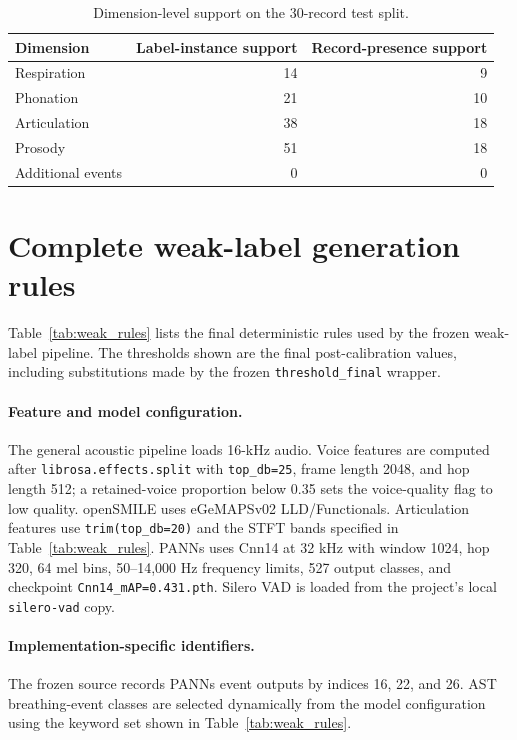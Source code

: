\documentclass[10pt]{article}
\begin{document}
\begin{table}[h]
\centering
\caption{Dimension-level support on the 30-record test split.}
\label{tab:test_dim_support}
\scriptsize
\begin{tabular}{lrr}
\toprule
Dimension & Label-instance support & Record-presence support \\
\midrule
Respiration & 14 & 9 \\
Phonation & 21 & 10 \\
Articulation & 38 & 18 \\
Prosody & 51 & 18 \\
Additional events & 0 & 0 \\
\bottomrule
\end{tabular}
\end{table}

\section{Complete weak-label generation rules}
Table~\ref{tab:weak_rules} lists the final deterministic rules used by the frozen weak-label pipeline. The thresholds shown are the final post-calibration values, including substitutions made by the frozen \texttt{threshold\_final} wrapper.

\paragraph{Feature and model configuration.}
The general acoustic pipeline loads 16-kHz audio. Voice features are computed after \texttt{librosa.effects.split} with \texttt{top\_db=25}, frame length 2048, and hop length 512; a retained-voice proportion below 0.35 sets the voice-quality flag to low quality. openSMILE uses eGeMAPSv02 LLD/Functionals. Articulation features use \texttt{trim(top\_db=20)} and the STFT bands specified in Table~\ref{tab:weak_rules}. PANNs uses Cnn14 at 32 kHz with window 1024, hop 320, 64 mel bins, 50--14,000 Hz frequency limits, 527 output classes, and checkpoint \texttt{Cnn14\_mAP=0.431.pth}. Silero VAD is loaded from the project's local \texttt{silero-vad} copy.

\paragraph{Implementation-specific identifiers.}
The frozen source records PANNs event outputs by indices 16, 22, and 26. AST breathing-event classes are selected dynamically from the model configuration using the keyword set shown in Table~\ref{tab:weak_rules}.
\end{document}
